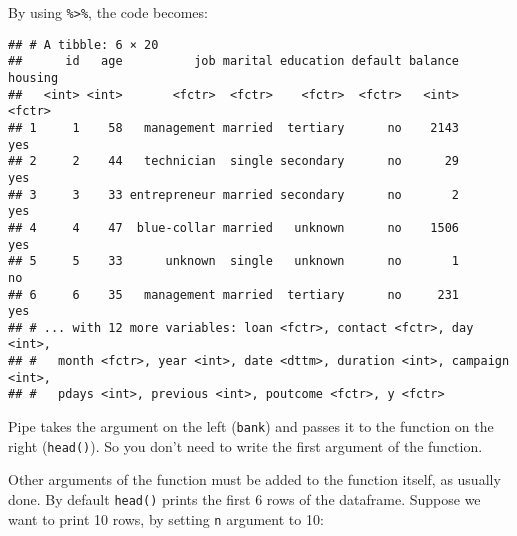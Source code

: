 \documentclass[]{book}
\newenvironment{Shaded}{\begin{snugshade}}{\end{snugshade}}
\newcommand{\KeywordTok}[1]{\textcolor[rgb]{0.13,0.29,0.53}{\textbf{{#1}}}}
\newcommand{\DataTypeTok}[1]{\textcolor[rgb]{0.13,0.29,0.53}{{#1}}}
\newcommand{\DecValTok}[1]{\textcolor[rgb]{0.00,0.00,0.81}{{#1}}}
\newcommand{\StringTok}[1]{\textcolor[rgb]{0.31,0.60,0.02}{{#1}}}
\newcommand{\NormalTok}[1]{{#1}}
\begin{document}
By using \texttt{\%\textgreater{}\%}, the code becomes:

\begin{Shaded}
\end{Shaded}

\begin{verbatim}
## # A tibble: 6 × 20
##      id   age          job marital education default balance housing
##   <int> <int>       <fctr>  <fctr>    <fctr>  <fctr>   <int>  <fctr>
## 1     1    58   management married  tertiary      no    2143     yes
## 2     2    44   technician  single secondary      no      29     yes
## 3     3    33 entrepreneur married secondary      no       2     yes
## 4     4    47  blue-collar married   unknown      no    1506     yes
## 5     5    33      unknown  single   unknown      no       1      no
## 6     6    35   management married  tertiary      no     231     yes
## # ... with 12 more variables: loan <fctr>, contact <fctr>, day <int>,
## #   month <fctr>, year <int>, date <dttm>, duration <int>, campaign <int>,
## #   pdays <int>, previous <int>, poutcome <fctr>, y <fctr>
\end{verbatim}

Pipe takes the argument on the left (\texttt{bank}) and passes it to the
function on the right (\texttt{head()}). So you don't need to write the
first argument of the function.

Other arguments of the function must be added to the function itself, as
usually done. By default \texttt{head()} prints the first 6 rows of the
dataframe. Suppose we want to print 10 rows, by setting \texttt{n}
argument to 10:

\begin{Shaded}
\end{Shaded}
\end{document}
